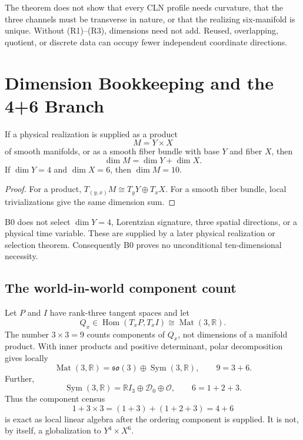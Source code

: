 \documentclass[11pt]{article}
\begin{document}
\begin{remark}
The theorem does not show that every CLN profile needs curvature, that the
three channels must be transverse in nature, or that the realizing
six-manifold is unique.  Without (R1)--(R3), dimensions need not add.  Reused,
overlapping, quotient, or discrete data can occupy fewer independent
coordinate directions.
\end{remark}

\section{Dimension Bookkeeping and the 4+6 Branch}

\begin{proposition}\label{prop:additivity}
If a physical realization is supplied as a product
\[
M=Y\times X
\]
of smooth manifolds, or as a smooth fiber bundle with base $Y$ and fiber $X$,
then
\[
\dim M=\dim Y+\dim X.
\]
If $\dim Y=4$ and $\dim X=6$, then $\dim M=10$.
\end{proposition}

\begin{proof}
For a product, $T_{(y,x)}M\cong T_yY\oplus T_xX$.  For a smooth fiber bundle,
local trivializations give the same dimension sum.
\end{proof}

\begin{remark}
B0 does not select $\dim Y=4$, Lorentzian signature, three spatial
directions, or a physical time variable.  These are supplied by a later
physical realization or selection theorem.  Consequently B0 proves no
unconditional ten-dimensional necessity.
\end{remark}

\subsection{The world-in-world component count}

Let $P$ and $I$ have rank-three tangent spaces and let
\[
Q_x\in\operatorname{Hom}(T_xP,T_xI)\cong\operatorname{Mat}(3,\mathbb R).
\]
The number $3\times3=9$ counts components of $Q_x$, not dimensions of a
manifold product.  With inner products and positive determinant, polar
decomposition gives locally
\[
\operatorname{Mat}(3,\mathbb R)
=
\mathfrak{so}(3)\oplus\operatorname{Sym}(3,\mathbb R),
\qquad
9=3+6.
\]
Further,
\[
\operatorname{Sym}(3,\mathbb R)
=
\mathbb RI_3\oplus\mathcal D_0\oplus\mathcal O,
\qquad
6=1+2+3.
\]
Thus the component census
\[
1+3\times3=(1+3)+(1+2+3)=4+6
\]
is exact as local linear algebra after the ordering component is supplied.
It is not, by itself, a globalization to $Y^4\times X^6$.
\end{document}
